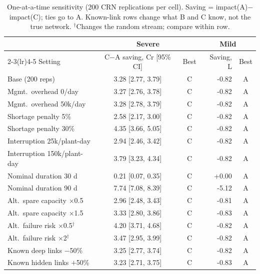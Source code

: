 \documentclass[conference]{IEEEtran}
\begin{document}
\begin{table}[t]\centering\caption{One-at-a-time sensitivity (200 CRN replications per cell). Saving = impact(A)$-$impact(C); ties go to A. Known-link rows change what B and C know, not the true network. $^\dagger$Changes the random stream; compare within row.}\label{tab:sens}
\scriptsize\setlength{\tabcolsep}{2pt}\begin{tabular}{@{}lccrc@{}}\toprule
 & \multicolumn{2}{c}{Severe} & \multicolumn{2}{c}{Mild}\\\cmidrule(lr){2-3}\cmidrule(lr){4-5}
Setting & C$-$A saving, Cr [95\% CI] & Best & Saving, L & Best\\\midrule
Base (200 reps) & 3.28 [2.77, 3.79] & C & -0.82 & A\\
Mgmt.\ overhead 0/day & 3.27 [2.76, 3.78] & C & -0.82 & A\\
Mgmt.\ overhead 50k/day & 3.28 [2.78, 3.79] & C & -0.82 & A\\
Shortage penalty 5\% & 2.58 [2.17, 3.00] & C & -0.82 & A\\
Shortage penalty 30\% & 4.35 [3.66, 5.05] & C & -0.82 & A\\
Interruption 25k/plant-day & 2.94 [2.46, 3.42] & C & -0.82 & A\\
Interruption 150k/plant-day & 3.79 [3.23, 4.34] & C & -0.82 & A\\
Nominal duration 30 d & 0.21 [0.07, 0.35] & C & +0.00 & A\\
Nominal duration 90 d & 7.74 [7.08, 8.39] & C & -5.12 & A\\
Alt.\ spare capacity $\times$0.5 & 2.96 [2.48, 3.43] & C & -0.81 & A\\
Alt.\ spare capacity $\times$1.5 & 3.33 [2.80, 3.86] & C & -0.83 & A\\
Alt.\ failure risk $\times$0.5$^\dagger$ & 4.20 [3.71, 4.68] & C & -0.82 & A\\
Alt.\ failure risk $\times$2$^\dagger$ & 3.47 [2.95, 3.99] & C & -0.82 & A\\
Known deep links $-$50\% & 3.25 [2.77, 3.74] & C & -0.82 & A\\
Known hidden links $+$50\% & 3.23 [2.71, 3.75] & C & -0.83 & A\\
\bottomrule\end{tabular}\end{table}
\end{document}
